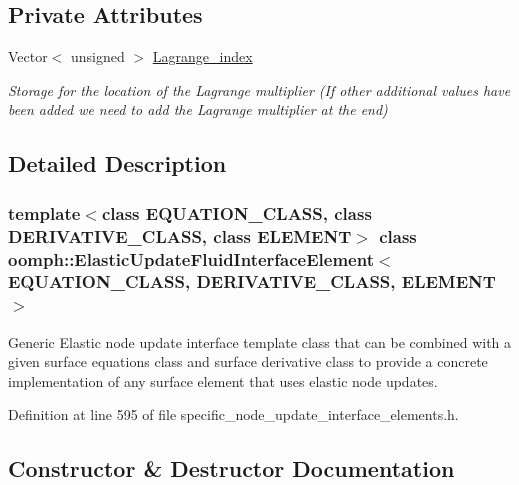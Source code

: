 \subsection*{Private Attributes}
\begin{DoxyCompactItemize}
\item 
Vector$<$ unsigned $>$ \hyperlink{classoomph_1_1ElasticUpdateFluidInterfaceElement_a7852050a89e3aac51ed3693814be9018}{Lagrange\+\_\+index}
\begin{DoxyCompactList}\small\item\em Storage for the location of the Lagrange multiplier (If other additional values have been added we need to add the Lagrange multiplier at the end) \end{DoxyCompactList}\end{DoxyCompactItemize}


\subsection{Detailed Description}
\subsubsection*{template$<$class E\+Q\+U\+A\+T\+I\+O\+N\+\_\+\+C\+L\+A\+SS, class D\+E\+R\+I\+V\+A\+T\+I\+V\+E\+\_\+\+C\+L\+A\+SS, class E\+L\+E\+M\+E\+NT$>$\newline
class oomph\+::\+Elastic\+Update\+Fluid\+Interface\+Element$<$ E\+Q\+U\+A\+T\+I\+O\+N\+\_\+\+C\+L\+A\+S\+S, D\+E\+R\+I\+V\+A\+T\+I\+V\+E\+\_\+\+C\+L\+A\+S\+S, E\+L\+E\+M\+E\+N\+T $>$}

Generic Elastic node update interface template class that can be combined with a given surface equations class and surface derivative class to provide a concrete implementation of any surface element that uses elastic node updates. 

Definition at line 595 of file specific\+\_\+node\+\_\+update\+\_\+interface\+\_\+elements.\+h.



\subsection{Constructor \& Destructor Documentation}
\mbox{\label{classoomph_1_1ElasticUpdateFluidInterfaceElement_a5e5d81d8ba6c7b6567ec6d1dd42c1c96}} 
